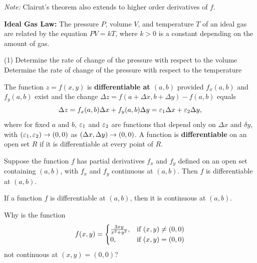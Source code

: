 \documentclass[../mathNotesPreamble]{subfiles}
\begin{document}
  \vspace*{0.5\baselineskip}\noindent
  \textit{Note:} Clairut's theorem also extends to higher order derivatives of $f$.

  \begin{ex*}
    \textbf{Ideal Gas Law:} The pressure $P$, volume $V$, and temperature $T$ of an ideal gas are related by the equation $PV=kT$, where $k>0$ is a constant depending on the amount of gas.
  \end{ex*}
  \begin{tasks}[after-item-skip=\stretch{1}, label=](1)
    \task Determine the rate of change of the pressure with respect to the volume
    \task Determine the rate of change of the pressure with respect to the temperature
  \end{tasks}
  \pagebreak

  \begin{defn*}[Differentiability]
    The function $z=f(x,y)$ is \textbf{differentiable at $(a,b)$} provided $f_x(a,b)$ and $f_y(a,b)$ exist and the change $\Delta z=f(a+\Delta x, b+\Delta y)-f(a,b)$ equals
      \[\Delta z=f_x(a,b)\Delta x+ f_y(a,b)\Delta y=\varepsilon_1\Delta x+\varepsilon_2\Delta y,\]
    where for fixed $a$ and $b$, $\varepsilon_1$ and $\varepsilon_2$ are functions that depend only on $\Delta x$ and $\delta y$, with ${\left(\varepsilon_1,\varepsilon_2\right)}\to (0,0)$ as ${\left(\Delta x,\Delta y\right)}\to(0,0)$. A function is \textbf{differentiable} on an open set $R$ if it is differentiable at every point of $R$.
  \end{defn*}

  \begin{thmBox*}
    Suppose the function $f$ has partial derivatives $f_x$ and $f_y$ defined on an open set containing $(a,b)$, with $f_x$ and $f_y$ continuous at $(a,b)$. Then $f$ is differentiable at $(a,b)$.
  \end{thmBox*}

  \begin{thmBox*}
    If a function $f$ is differentiable at $(a,b)$, then it is continuous at $(a,b)$.
  \end{thmBox*}
  \begin{ex*}
    Why is the function
      \[f(x,y)=\begin{cases}
        \frac{3xy}{x^2+y^2},& \textnormal{if } (x,y)\neq (0,0)\\
        0,& \textnormal{if } (x,y)=(0,0)
      \end{cases}\]
    not continuous at $(x,y)=(0,0)$?
  \end{ex*}
  \pagebreak
  
\end{document}
